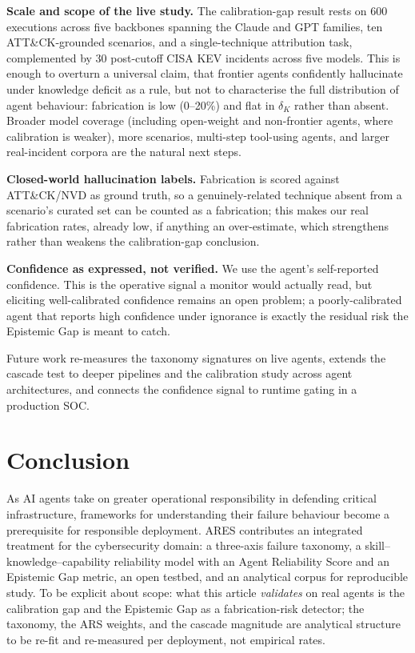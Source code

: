 \documentclass[journal,compsoc]{IEEEtran}
\newcommand{\ARES}{\textsc{ARES}}
\begin{document}
\textbf{Scale and scope of the live study.} The calibration-gap result
rests on 600 executions across five backbones spanning the Claude and GPT families, ten
ATT\&CK-grounded scenarios, and a single-technique attribution task,
complemented by 30 post-cutoff CISA KEV incidents across five models.
This is enough to overturn a universal claim, that frontier agents
confidently hallucinate under knowledge deficit as a rule, but not to
characterise the full distribution of agent behaviour: fabrication is
low (0--20\%) and flat in $\delta_K$ rather than absent. Broader model
coverage (including open-weight and non-frontier agents, where
calibration is weaker), more scenarios, multi-step tool-using agents,
and larger real-incident corpora are the natural next steps.

\textbf{Closed-world hallucination labels.} Fabrication is scored
against ATT\&CK/NVD as ground truth, so a genuinely-related technique
absent from a scenario's curated set can be counted as a fabrication;
this makes our real fabrication rates, already low, if anything an
over-estimate, which strengthens rather than weakens the calibration-gap
conclusion.

\textbf{Confidence as expressed, not verified.} We use the agent's
self-reported confidence. This is the operative signal a monitor would
actually read, but eliciting well-calibrated confidence remains an open
problem; a poorly-calibrated agent that reports high confidence under
ignorance is exactly the residual risk the Epistemic Gap is meant to
catch.

Future work re-measures the taxonomy signatures on live agents, extends
the cascade test to deeper pipelines and the calibration study across
agent architectures, and connects the confidence signal to runtime
gating in a production SOC.

\section{Conclusion}
\label{sec:conclusion}

As AI agents take on greater operational responsibility in defending
critical infrastructure, frameworks for understanding their failure
behaviour become a prerequisite for responsible deployment. \ARES{}
contributes an integrated treatment for the cybersecurity domain: a
three-axis failure taxonomy, a skill--knowledge--capability reliability
model with an Agent Reliability Score and an Epistemic Gap metric, an
open testbed, and an analytical corpus for reproducible study. To be
explicit about scope: what this article \emph{validates} on real agents
is the calibration gap and the Epistemic Gap as a fabrication-risk
detector; the taxonomy, the ARS weights, and the cascade magnitude are
analytical structure to be re-fit and re-measured per deployment, not
empirical rates.
\end{document}

